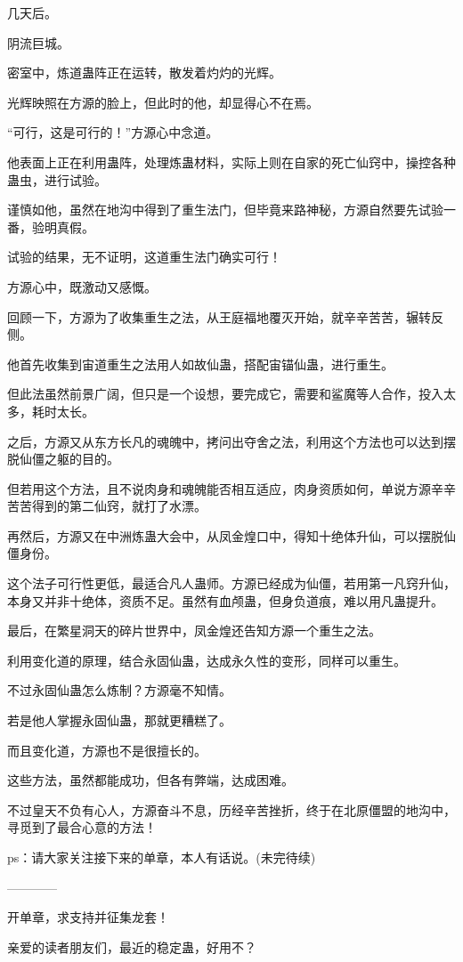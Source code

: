 \begin{this_body}
几天后。

阴流巨城。

密室中，炼道蛊阵正在运转，散发着灼灼的光辉。

光辉映照在方源的脸上，但此时的他，却显得心不在焉。

“可行，这是可行的！”方源心中念道。

他表面上正在利用蛊阵，处理炼蛊材料，实际上则在自家的死亡仙窍中，操控各种蛊虫，进行试验。

谨慎如他，虽然在地沟中得到了重生法门，但毕竟来路神秘，方源自然要先试验一番，验明真假。

试验的结果，无不证明，这道重生法门确实可行！

方源心中，既激动又感慨。

回顾一下，方源为了收集重生之法，从王庭福地覆灭开始，就辛辛苦苦，辗转反侧。

他首先收集到宙道重生之法用人如故仙蛊，搭配宙锚仙蛊，进行重生。

但此法虽然前景广阔，但只是一个设想，要完成它，需要和鲨魔等人合作，投入太多，耗时太长。

之后，方源又从东方长凡的魂魄中，拷问出夺舍之法，利用这个方法也可以达到摆脱仙僵之躯的目的。

但若用这个方法，且不说肉身和魂魄能否相互适应，肉身资质如何，单说方源辛辛苦苦得到的第二仙窍，就打了水漂。

再然后，方源又在中洲炼蛊大会中，从凤金煌口中，得知十绝体升仙，可以摆脱仙僵身份。

这个法子可行性更低，最适合凡人蛊师。方源已经成为仙僵，若用第一凡窍升仙，本身又并非十绝体，资质不足。虽然有血颅蛊，但身负道痕，难以用凡蛊提升。

最后，在繁星洞天的碎片世界中，凤金煌还告知方源一个重生之法。

利用变化道的原理，结合永固仙蛊，达成永久性的变形，同样可以重生。

不过永固仙蛊怎么炼制？方源毫不知情。

若是他人掌握永固仙蛊，那就更糟糕了。

而且变化道，方源也不是很擅长的。

这些方法，虽然都能成功，但各有弊端，达成困难。

不过皇天不负有心人，方源奋斗不息，历经辛苦挫折，终于在北原僵盟的地沟中，寻觅到了最合心意的方法！

ps：请大家关注接下来的单章，本人有话说。(未完待续)

------------

开单章，求支持并征集龙套！

亲爱的读者朋友们，最近的稳定蛊，好用不？


\end{this_body}
